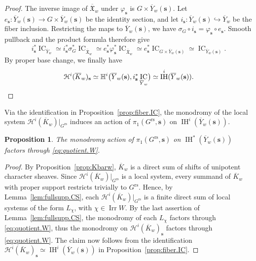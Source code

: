 \documentclass[11pt]{amsart}
\numberwithin{equation}{section}
\newtheorem{proposition}[theorem]{Proposition}
\theoremstyle{definition}
\DeclareMathOperator{\Irr}{\mathrm{Irr}}
\DeclareMathOperator{\IC}{\mathrm{IC}}
\def\cH{\mathcal {H}}
\def\fX{\mathfrak {X}}
\def\Grs{G^{\mathrm{rs}}}
\DeclareMathOperator{\IH}{\mathrm{IH}}
\begin{document}
\begin{proof}
	The inverse image of $\overline{\fX}_w$ under $\varphi_{\mathbf s}$ is $G\times\overline Y_w(\mathbf s)$.
	Let $e_{\mathbf s}:\overline Y_w(\mathbf s)\to G\times\overline Y_w(\mathbf s)$ be the identity section, and let $i_{\mathbf s}:\overline Y_w(\mathbf s)\hookrightarrow\overline Y_w$ be the fiber inclusion. 
	Restricting the maps to $\overline Y_w(\mathbf s)$, we have $\sigma_G\circ i_{\mathbf s}=\varphi_{\mathbf s}\circ e_{\mathbf s}$.
	Smooth pullback and the product formula therefore give
	\[
	i_{\mathbf s}^*\IC_{\overline Y_w}
	\simeq i_{\mathbf s}^*\sigma_G^*\IC_{\overline{\fX}_w}
	\simeq e_{\mathbf s}^*\varphi_{\mathbf s}^*\IC_{\overline{\fX}_w}
	\simeq e_{\mathbf s}^*\IC_{G\times\overline Y_w(\mathbf s)}
	\simeq\IC_{\overline Y_w(\mathbf s)}.
	\]
	By proper base change, we finally have
	\[
	\cH^i(\overline K_w)_{\mathbf s}
	\simeq\mathbb H^i\bigl(\overline Y_w(\mathbf s),
	i_{\mathbf s}^*\IC_{\overline Y_w}\bigr)
	\simeq\IH^i(\overline Y_w(\mathbf s)).\qedhere
	\]
\end{proof}

Via the identification in Proposition~\ref{prop:fiber.IC}, the monodromy of the local system $\cH^i(\overline K_w)|_{\Grs}$ induces an action of $\pi_1(\Grs,\mathbf{s})$ on $\IH^i(\overline Y_w(\mathbf{s}))$.


\smallskip


\begin{proposition}\label{prop:mono.fact}
	The monodromy action of $\pi_1(\Grs,\mathbf{s})$ on $\IH^*(\overline Y_w(\mathbf{s}))$ factors through \eqref{eq:quotient.W}.
\end{proposition}

\begin{proof}
By Proposition~\ref{prop:Kbarw}, $\overline K_w$ is a direct sum of shifts of unipotent character sheaves. 
Since $\cH^i(\overline K_w)|_{\Grs}$ is a local system, every summand of $\overline K_w$ with proper support restricts trivially to $\Grs$.
Hence, by Lemma~\ref{lem:fullsupp.CS}, each $\cH^i(\overline K_w)|_{\Grs}$ is a finite direct sum of local systems of the form $L_\chi$, with $\chi\in\Irr W$.
By the last assertion of Lemma~\ref{lem:fullsupp.CS}, the monodromy of each $L_\chi$ factors through \eqref{eq:quotient.W}, thus the monodromy on $\cH^i(\overline K_w)_{\mathbf{s}}$ factors through \eqref{eq:quotient.W}.
The claim now follows from the identification $\cH^i(\overline K_w)_{\mathbf{s}}\simeq \IH^i(\overline Y_w(\mathbf{s}))$ in Proposition~\ref{prop:fiber.IC}.
\end{proof}
\end{document}
